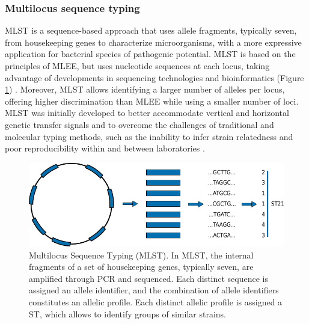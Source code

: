 \subsubsection{Multilocus sequence typing}

\ac{MLST} is a sequence-based approach that uses allele fragments, typically seven, from housekeeping genes to characterize microorganisms, with a more expressive application for bacterial species of pathogenic potential. \ac{MLST} is based on the principles of \ac{MLEE}, but uses nucleotide sequences at each locus, taking advantage of developments in sequencing technologies and bioinformatics (Figure \ref{fig:introduction_figure7}) \cite{urwin_multi-locus_2003}. Moreover, \ac{MLST} allows identifying a larger number of alleles per locus, offering higher discrimination than \ac{MLEE} while using a smaller number of loci. \ac{MLST} was initially developed to better accommodate vertical and horizontal genetic transfer signals and to overcome the challenges of traditional and molecular typing methods, such as the inability to infer strain relatedness and poor reproducibility within and between laboratories \cite{maiden_multilocus_1998}.

\begin{figure}[h!]
    \centering
    \includegraphics[angle=0,width=\textwidth]{figures/introduction/Figure7.pdf}
    \caption[Multilocus Sequence Typing]{Multilocus Sequence Typing (MLST). In \ac{MLST}, the internal fragments of a set of housekeeping genes, typically seven, are amplified through \ac{PCR} and sequenced. Each distinct sequence is assigned an allele identifier, and the combination of allele identifiers constitutes an allelic profile. Each distinct allelic profile is assigned a \ac{ST}, which allows to identify groups of similar strains.}
    \label{fig:introduction_figure7}
\end{figure}

